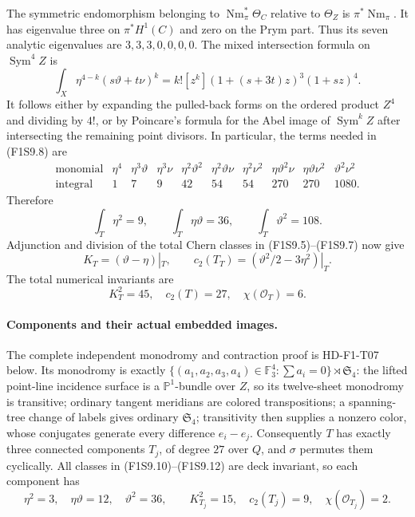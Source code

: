 The symmetric endomorphism belonging to $\operatorname{Nm}_\pi^*
\Theta_C$ relative to $\Theta_Z$ is $\pi^*\operatorname{Nm}_\pi$.
It has eigenvalue three on $\pi^*H^1(C)$ and zero on the Prym part.
Thus its seven analytic eigenvalues are $3,3,3,0,0,0,0$.
The mixed intersection formula on $\operatorname{Sym}^4 Z$ is
\[
 \int_X\eta^{4-k}(s\vartheta+t\nu)^k
   = k![z^k](1+(s+3t)z)^3(1+sz)^4.
 \tag{F1S9.9}
\]
It follows either by expanding the pulled-back forms on the ordered
product $Z^4$ and dividing by $4!$, or by Poincare's formula for the
Abel image of $\operatorname{Sym}^k Z$ after intersecting the remaining
point divisors. In particular, the terms needed in (F1S9.8) are
\[
\begin{array}{c|rrrrrrrrr}
 \text{monomial}&\eta^4&\eta^3\vartheta&\eta^3\nu&
 \eta^2\vartheta^2&\eta^2\vartheta\nu&\eta^2\nu^2&
 \eta\vartheta^2\nu&\eta\vartheta\nu^2&\vartheta^2\nu^2\\ \hline
 \text{integral}&1&7&9&42&54&54&270&270&1080.
\end{array}
\]
Therefore
\[
 \int_T\eta^2=9,\qquad
 \int_T\eta\vartheta=36,\qquad
 \int_T\vartheta^2=108.
 \tag{F1S9.10}
\]
Adjunction and division of the total Chern classes in (F1S9.5)--(F1S9.7)
now give
\[
 K_T=(\vartheta-\eta)|_T,\qquad
 c_2(T_T)=(\vartheta^2/2-3\eta^2)|_T.
 \tag{F1S9.11}
\]
The total numerical invariants are
\[
                         K_T^2=45,\quad c_2(T)=27,\quad
                         \chi(\mathcal O_T)=6.
 \tag{F1S9.12}
\]

\paragraph{Components and their actual embedded images.}
The complete independent monodromy and contraction proof is
HD-F1-T07 below.
Its monodromy is exactly
$\{(a_1,a_2,a_3,a_4)\in\mathbb F_3^4:\sum a_i=0\}\rtimes\mathfrak S_4$:
the lifted point-line incidence surface is a $\mathbb P^1$-bundle over
$Z$, so its twelve-sheet monodromy is transitive; ordinary tangent
meridians are colored transpositions; a spanning-tree change of labels
gives ordinary $\mathfrak S_4$; transitivity then supplies a nonzero
color, whose conjugates generate every difference $e_i-e_j$.
Consequently $T$ has exactly three connected components $T_j$, of
degree $27$ over $Q$, and $\sigma$ permutes them cyclically.
All classes in (F1S9.10)--(F1S9.12) are deck invariant, so each component
has
\[
 \eta^2=3,\quad\eta\vartheta=12,\quad\vartheta^2=36,
 \qquad K_{T_j}^2=15,\quad c_2(T_j)=9,\quad
 \chi(\mathcal O_{T_j})=2.
 \tag{F1S9.13}
\]

